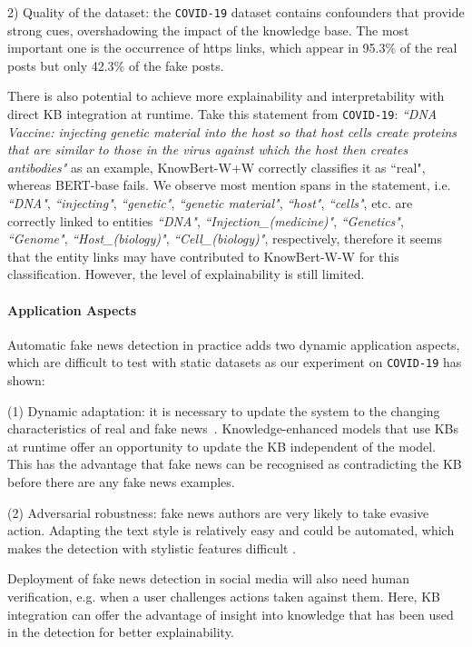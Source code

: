 \documentclass[letterpaper]{article} %
\begin{document}
2) Quality of the dataset: 
the \texttt{COVID-19} dataset contains confounders that provide strong cues, overshadowing the impact of the knowledge base. 
The most important one is the occurrence of https links, which appear in 95.3\% of the real posts but only 42.3\% of the fake posts. 

There is also potential to achieve more explainability and interpretability with direct KB integration at runtime. 
Take this statement from \texttt{COVID-19}: \textit{``DNA Vaccine: injecting genetic material into the host so that host cells create proteins that are similar to those in the virus against which the host then creates antibodies"} as an example,
KnowBert-W+W correctly classifies it as ``real", whereas BERT-base fails.
We observe most mention spans in the statement, i.e.  \textit{``DNA"}, \textit{``injecting"}, \textit{``genetic"}, \textit{``genetic material"}, \textit{``host"}, \textit{``cells"}, etc. are correctly linked to entities \textit{``DNA"}, \textit{``Injection\_(medicine)"}, \textit{``Genetics"}, \textit{``Genome"}, \textit{``Host\_(biology)"}, \textit{``Cell\_(biology)"}, respectively, 
therefore it seems that the entity links may have contributed to KnowBert-W-W for this classification. 
However, the level of explainability is still limited.


\paragraph{Application Aspects}
Automatic fake news detection in practice adds two dynamic application aspects, which are difficult to test with static datasets as our experiment on \texttt{COVID-19} has shown:

(1) Dynamic adaptation: it is necessary to update the system to the changing characteristics of real and fake news~\cite{silva2021concept}.
Knowledge-enhanced models that use KBs at runtime offer an opportunity to update the KB independent of the model. %
This has the advantage that fake news can be recognised as contradicting the KB before there are any fake news examples. 

(2) Adversarial robustness: fake news authors are very likely to take evasive action. 
Adapting the text style is relatively easy and could be automated, which makes the detection with stylistic features difficult \citep[see][]{NEURIPS2019_3e9f0fc9, schuster-etal-2020-limitations}. 

Deployment of fake news detection in social media will also need human verification, e.g. when a user challenges actions taken against them. 
Here, KB integration can offer the advantage of insight into knowledge that has been used in the detection for better explainability. 
\end{document}
